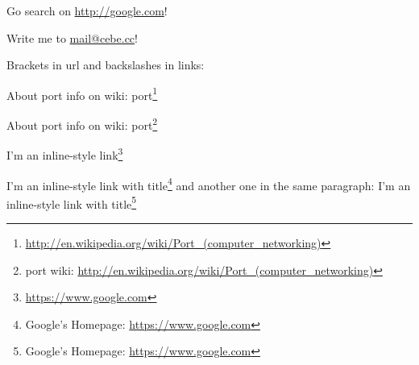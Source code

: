 Go search on \url{http://google.com}!

Write me to \href{mailto:mail@cebe.cc}{mail@cebe.cc}!

Brackets in url and backslashes in links:

About port info on wiki: port\footnote{\url{http://en.wikipedia.org/wiki/Port\_(computer\_networking)}}

About port info on wiki: port\footnote{port wiki: \url{http://en.wikipedia.org/wiki/Port\_(computer\_networking)}}

I'm an inline-style link\footnote{\url{https://www.google.com}}

I'm an inline-style link with title\footnote{Google's Homepage: \url{https://www.google.com}}
and another one in the same paragraph:
I'm an inline-style link with title\footnote{Google's Homepage: \url{https://www.google.com}}

